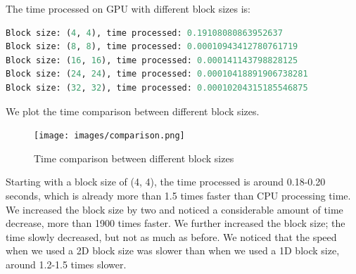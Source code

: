 \documentclass[12pt]{article}
\begin{document}
\noindent
The time processed on GPU with different block sizes is:

\begin{lstlisting}[language=Python]
Block size: (4, 4), time processed: 0.19108080863952637
Block size: (8, 8), time processed: 0.00010943412780761719
Block size: (16, 16), time processed: 0.000141143798828125
Block size: (24, 24), time processed: 0.00010418891906738281
Block size: (32, 32), time processed: 0.00010204315185546875
\end{lstlisting}

\noindent
We plot the time comparison between different block sizes. 

\begin{figure}[H]
\centering
    \texttt{[image: images/comparison.png]}
    \caption{Time comparison between different block sizes}
\end{figure}

\noindent
Starting with a block size of (4, 4), the time processed is around 0.18-0.20 seconds, which is already more than 1.5 times faster than CPU processing time. We increased the block size by two and noticed a considerable amount of time decrease, more than 1900 times faster. We further increased the block size; the time slowly decreased, but not as much as before. We noticed that the speed when we used a 2D block size was slower than when we used a 1D block size, around 1.2-1.5 times slower. 
\end{document}
